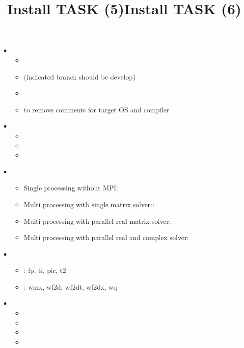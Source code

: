 \documentclass[12pt]{article}
\begin{document}
\title{Install TASK (5)}
\begin{itemize}
\item
{}
\begin{itemize}
\item
{}
\item
{} \quad (indicated branch should be develop)
\item
{}
\item
{} to remove comments for target OS and compiler
\end{itemize}
\item
{}
\begin{itemize}
\item
{}
\item
{}
\item
{}
\end{itemize}
\end{itemize}

\title{Install TASK (6)}
\begin{itemize}
\item
{}
\begin{itemize}
\item
  Single processing without MPI: 
\item
  Multi processing with single matrix solver:: 
\item
  Multi processing with parallel real matrix solver: 
\item
  Multi processing with parallel real and complex solver: \\
\end{itemize}
\item
  \begin{itemize}
  \item
    : fp, ti, pic, t2
  \item
    : wmx, wf2d, wf2dt, wf2dx, wq
  \end{itemize}
\item
  \begin{itemize}
  \item
  \item
  \item
  \item
  \end{itemize}
\end{itemize}
\end{document}
